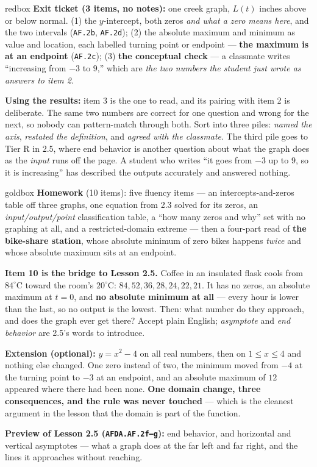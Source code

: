 \documentclass[10pt]{article}
\begin{document}
\boxguard[16]
\begin{skillbox}{redbox}
\textbf{Exit ticket (3 items, no notes):} one creek graph, $L(t)$ inches above or below normal.
(1) the $y$-intercept, both zeros \emph{and what a zero means here}, and the two intervals
(\texttt{AF.2b}, \texttt{AF.2d}); (2) the absolute maximum and minimum as value and location, each
labelled turning point or endpoint --- \textbf{the maximum is at an endpoint} (\texttt{AF.2c});
(3) \textbf{the conceptual check} --- a classmate writes ``increasing from $-3$ to $9$,'' which are
\emph{the two numbers the student just wrote as answers to item 2}.

\textbf{Using the results:} item 3 is the one to read, and its pairing with item 2 is deliberate. The
same two numbers are correct for one question and wrong for the next, so nobody can pattern-match
through both. Sort into three piles: \emph{named the axis}, \emph{restated the definition}, and
\emph{agreed with the classmate}. The third pile goes to Tier R in 2.5, where end behavior is another
question about what the graph does as the \emph{input} runs off the page. A student who writes ``it
goes from $-3$ up to $9$, so it is increasing'' has described the outputs accurately and answered
nothing.
\end{skillbox}

\boxguard[18]
\begin{skillbox}{goldbox}
\textbf{Homework} (10 items): five fluency items --- an intercepts-and-zeros table off three graphs,
one equation from 2.3 solved for its zeros, an \emph{input/output/point} classification table, a
``how many zeros and why'' set with no graphing at all, and a restricted-domain extreme --- then a
four-part read of \textbf{the bike-share station}, whose absolute minimum of zero bikes happens
\emph{twice} and whose absolute maximum sits at an endpoint.

\textbf{Item 10 is the bridge to Lesson 2.5.} Coffee in an insulated flask cools from $84^\circ$C
toward the room's $20^\circ$C: $84, 52, 36, 28, 24, 22, 21$. It has no zeros, an absolute maximum at
$t=0$, and \textbf{no absolute minimum at all} --- every hour is lower than the last, so no output is
the lowest. Then: what number do they approach, and does the graph ever get there? Accept plain
English; \emph{asymptote} and \emph{end behavior} are 2.5's words to introduce.

\textbf{Extension (optional):} $y=x^2-4$ on all real numbers, then on $1 \le x \le 4$ and nothing else
changed. One zero instead of two, the minimum moved from $-4$ at the turning point to $-3$ at an
endpoint, and an absolute maximum of $12$ appeared where there had been none. \textbf{One domain
change, three consequences, and the rule was never touched} --- which is the cleanest argument in the
lesson that the domain is part of the function.

\textbf{Preview of Lesson 2.5 (\texttt{AFDA.AF.2f--g}):} end behavior, and horizontal and vertical
asymptotes --- what a graph does at the far left and far right, and the lines it approaches without
reaching.
\end{skillbox}
\end{document}
